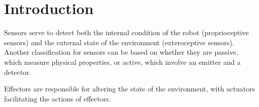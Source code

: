 \section{Introduction}

Sensors serve to detect both the internal condition of the robot (proprioceptive sensors) and the external state of the environment (exteroceptive sensors).
Another classification for sensors can be based on whether they are passive, which measure physical properties, or active, which involve an emitter and a detector.

Effectors are responsible for altering the state of the environment, with actuators facilitating the actions of effectors.